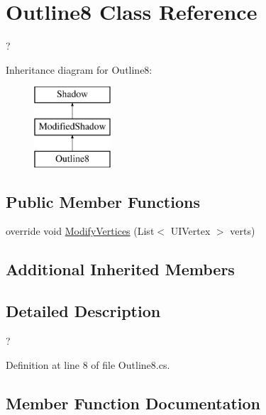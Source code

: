 \hypertarget{class_outline8}{}\section{Outline8 Class Reference}
\label{class_outline8}


?  


Inheritance diagram for Outline8\+:\begin{figure}[H]
\begin{center}
\leavevmode
\includegraphics[height=3.000000cm]{class_outline8}
\end{center}
\end{figure}
\subsection*{Public Member Functions}
\begin{DoxyCompactItemize}
\item 
override void \mbox{\hyperlink{class_outline8_a519d28a745afb06c930d467a308c49dc}{Modify\+Vertices}} (List$<$ U\+I\+Vertex $>$ verts)
\end{DoxyCompactItemize}
\subsection*{Additional Inherited Members}


\subsection{Detailed Description}
? 



Definition at line 8 of file Outline8.\+cs.



\subsection{Member Function Documentation}
\mbox{\label{class_outline8_a519d28a745afb06c930d467a308c49dc}} 
